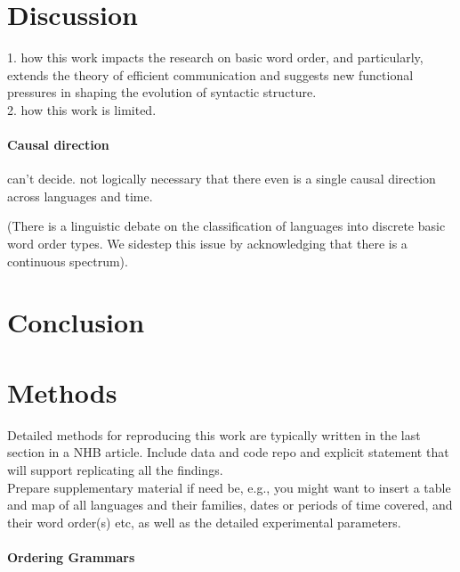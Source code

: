 \documentclass[11pt,a4paper]{article}
\begin{document}
\section{Discussion}

{\color{blue} 1. how this work impacts the research on basic word order, and particularly, extends the theory of efficient communication and suggests new functional pressures in shaping the evolution of syntactic structure.}\\

{\color{blue} 2. how this work is limited.} \paragraph{Causal direction} can't decide. not logically necessary that there even is a single causal direction across languages and time.


(There is a linguistic debate on the classification of languages into discrete basic word order types. We sidestep this issue by acknowledging that there is a continuous spectrum).


\section{Conclusion}

\section*{Methods}

{\color{blue}Detailed methods for reproducing this work are typically written in the last section in a NHB article. Include data and code repo and explicit statement that will support replicating all the findings.}\\

{\color{blue}Prepare supplementary material if need be, e.g., you might want to insert a table and map of all languages and their families, dates or periods of time covered, and their word order(s) etc, as well as the detailed experimental parameters.}


\paragraph{Ordering Grammars}




\end{document}
